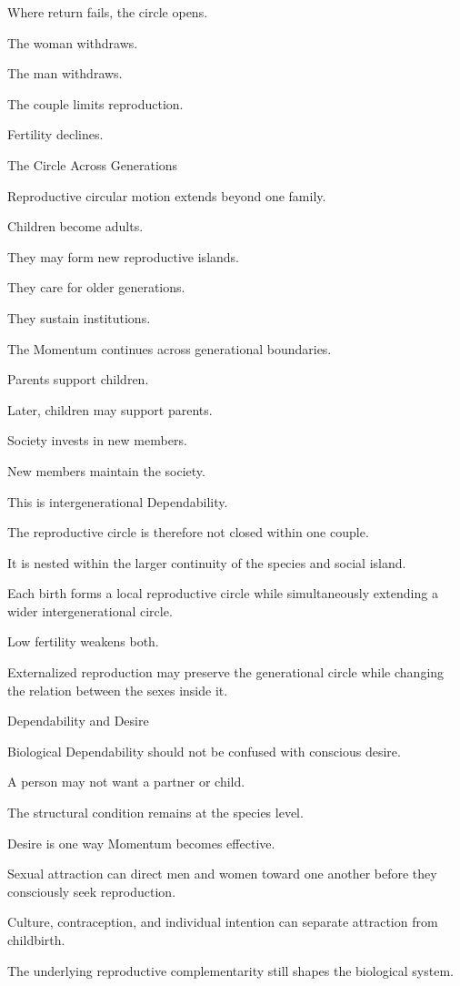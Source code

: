 Where return fails, the circle opens.

The woman withdraws.

The man withdraws.

The couple limits reproduction.

Fertility declines.

The Circle Across Generations

Reproductive circular motion extends beyond one family.

Children become adults.

They may form new reproductive islands.

They care for older generations.

They sustain institutions.

The Momentum continues across generational boundaries.

Parents support children.

Later, children may support parents.

Society invests in new members.

New members maintain the society.

This is intergenerational Dependability.

The reproductive circle is therefore not closed within one couple.

It is nested within the larger continuity of the species and social island.

Each birth forms a local reproductive circle while simultaneously extending a wider intergenerational circle.

Low fertility weakens both.

Externalized reproduction may preserve the generational circle while changing the relation between the sexes inside it.

Dependability and Desire

Biological Dependability should not be confused with conscious desire.

A person may not want a partner or child.

The structural condition remains at the species level.

Desire is one way Momentum becomes effective.

Sexual attraction can direct men and women toward one another before they consciously seek reproduction.

Culture, contraception, and individual intention can separate attraction from childbirth.

The underlying reproductive complementarity still shapes the biological system.

